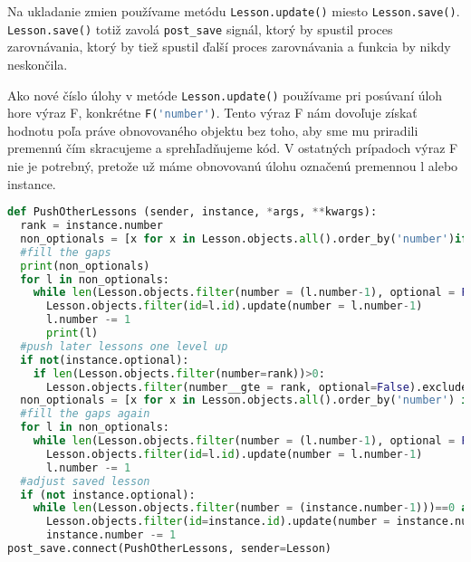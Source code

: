Na ukladanie zmien používame metódu \lstinline[language=Python]{Lesson.update()} miesto
\lstinline[language=Python]{Lesson.save()}. \lstinline[language=Python]{Lesson.save()} totiž zavolá
\lstinline[language=Python]{post_save} signál, ktorý by spustil proces zarovnávania, ktorý by tiež
spustil ďalší proces zarovnávania a funkcia by nikdy neskončila.

Ako nové číslo úlohy v metóde \lstinline[language=Python]{Lesson.update()} používame pri posúvaní úloh hore výraz F,
konkrétne \lstinline[language=Python]{F('number')}. Tento výraz F nám dovoľuje získať hodnotu
poľa práve obnovovaného objektu bez toho, aby sme mu priradili premennú čím skracujeme
a sprehľadňujeme kód. V ostatných prípadoch výraz F nie je potrebný, pretože už máme
obnovovanú úlohu označenú premennou l alebo instance.
\newpage
\begin{lstlisting}[language=Python, title = Posúvanie úloh]
def PushOtherLessons (sender, instance, *args, **kwargs):
  rank = instance.number
  non_optionals = [x for x in Lesson.objects.all().order_by('number')if not(x.optional) and x.id!=instance.id]
  #fill the gaps
  print(non_optionals)
  for l in non_optionals:
    while len(Lesson.objects.filter(number = (l.number-1), optional = False))==0 and l.number>1:
      Lesson.objects.filter(id=l.id).update(number = l.number-1)
      l.number -= 1
      print(l)
  #push later lessons one level up
  if not(instance.optional):
    if len(Lesson.objects.filter(number=rank))>0:
      Lesson.objects.filter(number__gte = rank, optional=False).exclude(id=instance.id).update(number = F('number')+1)
  non_optionals = [x for x in Lesson.objects.all().order_by('number') if not(x.optional) and x.id!=instance.id]
  #fill the gaps again
  for l in non_optionals:
    while len(Lesson.objects.filter(number = (l.number-1), optional = False))==0 and l.number>1:
      Lesson.objects.filter(id=l.id).update(number = l.number-1)
      l.number -= 1
  #adjust saved lesson
  if (not instance.optional):
    while len(Lesson.objects.filter(number = (instance.number-1)))==0 and instance.number>1:
      Lesson.objects.filter(id=instance.id).update(number = instance.number-1)
      instance.number -= 1
post_save.connect(PushOtherLessons, sender=Lesson)
\end{lstlisting}
